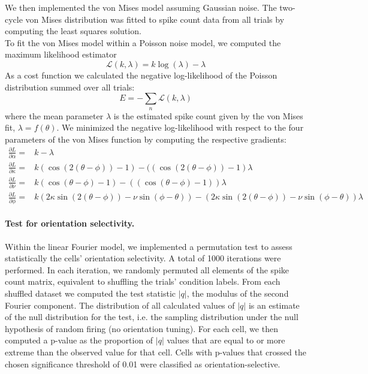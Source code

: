 \documentclass[10pt]{article}
\begin{document}
We then implemented the von Mises model assuming Gaussian noise. The two-cycle von Mises distribution was fitted to spike count data from all trials by computing the least squares solution. \\
To fit the von Mises model within a Poisson noise model, we computed the maximum likelihood estimator
\begin{equation*}
\mathcal{L}(k,\lambda) = k\log(\lambda)-\lambda
\end{equation*}
As a cost function we calculated the negative log-likelihood of the Poisson distribution summed over all trials: 
\begin{equation*}
E = - \sum_n \mathcal{L}(k,\lambda)
\end{equation*}
where the mean parameter $\lambda$ is the estimated spike count given by the von Mises fit, $\lambda = f(\theta)$. We minimized the negative log-likelihood with respect to the four parameters of the von Mises function by computing the respective gradients:
\begin{align*}
 \frac{\partial L}{\partial \alpha} = &k - \lambda  \\
 \frac{\partial L}{\partial \kappa} = &k(\cos(2(\theta-\phi))-1) - ((\cos(2(\theta-\phi))-1) \lambda \\
 \frac{\partial L}{\partial \nu} = &k(\cos(\theta-\phi)-1) - ((\cos(\theta-\phi)-1)) \lambda \\
 \frac{\partial L}{\partial \phi} =  & k(2\kappa \sin(2(\theta-\phi)) - \nu \sin(\phi-\theta)) -(2\kappa \sin(2(\theta-\phi))- \nu \sin(\phi-\theta)) \lambda
\end{align*}

\paragraph{Test for orientation selectivity.} Within the linear Fourier model, we implemented a permutation test to assess statistically the cells' orientation selectivity. A total of 1000 iterations were performed. In each iteration, we randomly permuted all elements of the spike count matrix, equivalent to shuffling the trials' condition labels. From each shuffled dataset we computed the test statistic $|q|$, the modulus of the second Fourier component. The distribution of all calculated values of $|q|$ is an estimate of the null distribution for the test, i.e. the sampling distribution under the null hypothesis of random firing (no orientation tuning). For each cell, we then computed a p-value as the proportion of $|q|$ values that are equal to or more extreme than the observed value for that cell. Cells with p-values that crossed the chosen significance threshold of 0.01 were classified as orientation-selective.
\end{document}
